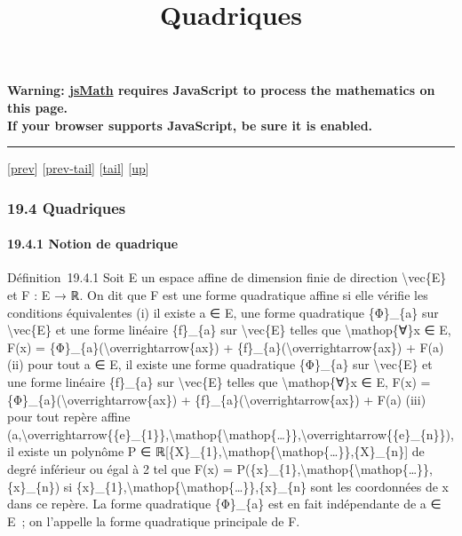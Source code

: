 \documentclass[]{article}
\title{Quadriques}
\author{}
\date{}
\begin{document}
\maketitle

\textbf{Warning: \href{http://www.math.union.edu/locate/jsMath}{jsMath}
requires JavaScript to process the mathematics on this page.\\ If your
browser supports JavaScript, be sure it is enabled.}

\begin{center}\rule{3in}{0.4pt}\end{center}

{[}\href{coursse102.html}{prev}{]}
{[}\href{coursse102.html\#tailcoursse102.html}{prev-tail}{]}
{[}\hyperref[tailcoursse103.html]{tail}{]}
{[}\href{coursch20.html\#coursse103.html}{up}{]}

\subsubsection{19.4 Quadriques}

\paragraph{19.4.1 Notion de quadrique}

Définition~19.4.1 Soit E un espace affine de dimension finie de
direction \textbackslash{}vec\{E\} et F : E → ℝ. On dit que F est une
forme quadratique affine si elle vérifie les conditions équivalentes (i)
il existe a ∈ E, une forme quadratique \{Φ\}\_\{a\} sur
\textbackslash{}vec\{E\} et une forme linéaire \{f\}\_\{a\} sur
\textbackslash{}vec\{E\} telles que \textbackslash{}mathop\{∀\}x ∈ E,
F(x) = \{Φ\}\_\{a\}(\textbackslash{}overrightarrow\{ax\}) +
\{f\}\_\{a\}(\textbackslash{}overrightarrow\{ax\}) + F(a) (ii) pour tout
a ∈ E, il existe une forme quadratique \{Φ\}\_\{a\} sur
\textbackslash{}vec\{E\} et une forme linéaire \{f\}\_\{a\} sur
\textbackslash{}vec\{E\} telles que \textbackslash{}mathop\{∀\}x ∈ E,
F(x) = \{Φ\}\_\{a\}(\textbackslash{}overrightarrow\{ax\}) +
\{f\}\_\{a\}(\textbackslash{}overrightarrow\{ax\}) + F(a) (iii) pour
tout repère affine
(a,\textbackslash{}overrightarrow\{\{e\}\_\{1\}\},\textbackslash{}mathop\{\textbackslash{}mathop\{\ldots{}\}\},\textbackslash{}overrightarrow\{\{e\}\_\{n\}\}),
il existe un polynôme P ∈
ℝ{[}\{X\}\_\{1\},\textbackslash{}mathop\{\textbackslash{}mathop\{\ldots{}\}\},\{X\}\_\{n\}{]}
de degré inférieur ou égal à 2 tel que F(x) =
P(\{x\}\_\{1\},\textbackslash{}mathop\{\textbackslash{}mathop\{\ldots{}\}\},\{x\}\_\{n\})
si
\{x\}\_\{1\},\textbackslash{}mathop\{\textbackslash{}mathop\{\ldots{}\}\},\{x\}\_\{n\}
sont les coordonnées de x dans ce repère. La forme quadratique
\{Φ\}\_\{a\} est en fait indépendante de a ∈ E~; on l'appelle la forme
quadratique principale de F.
\end{document}
